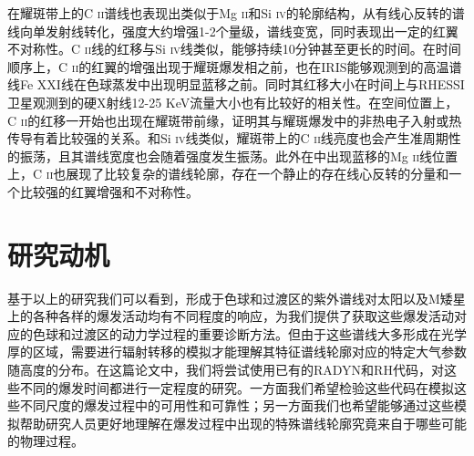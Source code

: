 在耀斑带上的C \textsc{ii}谱线也表现出类似于Mg \textsc{ii}和Si \textsc{iv}的轮廓结构，从有线心反转的谱线向单发射线转化，强度大约增强1-2个量级，谱线变宽，同时表现出一定的红翼不对称性\parencites{Li2015,Li2017}。C \textsc{ii}线的红移与Si \textsc{iv}线类似\parencites{Brosius2017}，能够持续10分钟甚至更长的时间\parencites{Li2017}。在时间顺序上，C \textsc{ii}的红翼的增强出现于耀斑爆发相之前\parencites{Sadykov2015}，也在IRIS能够观测到的高温谱线Fe XXI线在色球蒸发中出现明显蓝移之前\parencites{Brosius2018}。同时其红移大小在时间上与RHESSI卫星观测到的硬X射线12-25 KeV流量大小也有比较好的相关性\parencites{Sadykov2016}。在空间位置上，C \textsc{ii}的红移一开始也出现在耀斑带前缘\parencites{Battaglia2015}，证明其与耀斑爆发中的非热电子入射或热传导有着比较强的关系。和Si \textsc{iv}线类似，耀斑带上的C \textsc{ii}线亮度也会产生准周期性的振荡\parencites{Brosius2015,Brosius2018}，且其谱线宽度也会随着强度发生振荡\parencites{Warren2016}。此外在\textcites{Tei2018}中出现蓝移的Mg \textsc{ii}线位置上，C \textsc{ii}也展现了比较复杂的谱线轮廓，存在一个静止的存在线心反转的分量和一个比较强的红翼增强和不对称性。

\section{研究动机}
基于以上的研究我们可以看到，形成于色球和过渡区的紫外谱线对太阳以及M矮星上的各种各样的爆发活动均有不同程度的响应，为我们提供了获取这些爆发活动对应的色球和过渡区的动力学过程的重要诊断方法。但由于这些谱线大多形成在光学厚的区域，需要进行辐射转移的模拟才能理解其特征谱线轮廓对应的特定大气参数随高度的分布。在这篇论文中，我们将尝试使用已有的RADYN和RH代码，对这些不同的爆发时间都进行一定程度的研究。一方面我们希望检验这些代码在模拟这些不同尺度的爆发过程中的可用性和可靠性；另一方面我们也希望能够通过这些模拟帮助研究人员更好地理解在爆发过程中出现的特殊谱线轮廓究竟来自于哪些可能的物理过程。


